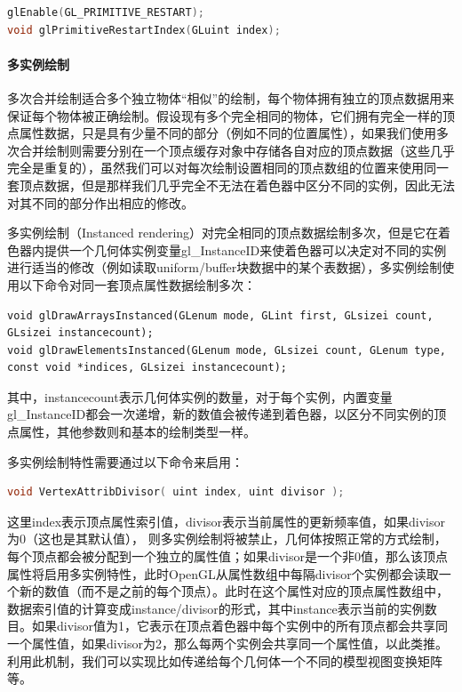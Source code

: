 \begin{lstlisting}[language=C++]
glEnable(GL_PRIMITIVE_RESTART)​;
void glPrimitiveRestartIndex(GLuint index​);
\end{lstlisting}





\paragraph{多实例绘制}
多次合并绘制适合多个独立物体“相似”的绘制，每个物体拥有独立的顶点数据用来保证每个物体被正确绘制。假设现有多个完全相同的物体，它们拥有完全一样的顶点属性数据，只是具有少量不同的部分（例如不同的位置属性），如果我们使用多次合并绘制则需要分别在一个顶点缓存对象中存储各自对应的顶点数据（这些几乎完全是重复的），虽然我们可以对每次绘制设置相同的顶点数组的位置来使用同一套顶点数据，但是那样我们几乎完全不无法在着色器中区分不同的实例，因此无法对其不同的部分作出相应的修改。

多实例绘制（Instanced rendering）对完全相同的顶点数据绘制多次，但是它在着色器内提供一个几何体实例变量gl\_InstanceID来使着色器可以决定对不同的实例进行适当的修改（例如读取uniform/buffer块数据中的某个表数据），多实例绘制使用以下命令对同一套顶点属性数据绘制多次：

\begin{lstlisting}
void glDrawArraysInstanced​(GLenum mode​, GLint first​, GLsizei count​, GLsizei instancecount​);
void glDrawElementsInstanced​(GLenum mode​, GLsizei count​, GLenum type​, const void *indices​, GLsizei instancecount​);
\end{lstlisting}

其中，instancecount表示几何体实例的数量，对于每个实例，内置变量gl\_InstanceID都会一次递增，新的数值会被传递到着色器，以区分不同实例的顶点属性，其他参数则和基本的绘制类型一样。

多实例绘制特性需要通过以下命令来启用：

\begin{lstlisting}[language=C++]
void VertexAttribDivisor( uint index, uint divisor );
\end{lstlisting}

这里index表示顶点属性索引值，divisor表示当前属性的更新频率值，如果divisor为0（这也是其默认值）， 则多实例绘制将被禁止，几何体按照正常的方式绘制，每个顶点都会被分配到一个独立的属性值；如果divisor是一个非0值，那么该顶点属性将启用多实例特性，此时OpenGL从属性数组中每隔divisor个实例都会读取一个新的数值（而不是之前的每个顶点）。此时在这个属性对应的顶点属性数组中，数据索引值的计算变成instance/divisor的形式，其中instance表示当前的实例数目。如果divisor值为1，它表示在顶点着色器中每个实例中的所有顶点都会共享同一个属性值，如果divisor为2，那么每两个实例会共享同一个属性值，以此类推。利用此机制，我们可以实现比如传递给每个几何体一个不同的模型视图变换矩阵等。





